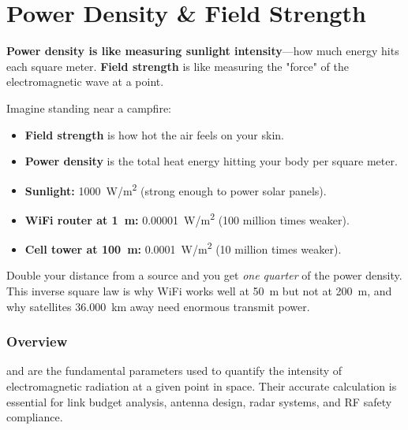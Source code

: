 
\chapter{Power Density \& Field Strength}
\label{ch:power-density}

\begin{nontechnical}
    \textbf{Power density is like measuring sunlight intensity}---how much energy hits each square meter. \textbf{Field strength} is like measuring the "force" of the electromagnetic wave at a point.

     Imagine standing near a campfire:
    \begin{itemize}
        \item \textbf{Field strength} is how hot the air feels on your skin.
        \item \textbf{Power density} is the total heat energy hitting your body per square meter.
    \end{itemize}

    \begin{itemize}
        \item \textbf{Sunlight:} \qty{1000}{W/m^2} (strong enough to power solar panels).
        \item \textbf{WiFi router at \qty{1}{m}:} \qty{0.00001}{W/m^2} (100 million times weaker).
        \item \textbf{Cell tower at \qty{100}{m}:} \qty{0.0001}{W/m^2} (10 million times weaker).
    \end{itemize}

     Double your distance from a source and you get \emph{one quarter} of the power density. This inverse square law is why WiFi works well at \qty{50}{m} but not at \qty{200}{m}, and why satellites \qty{36,000}{km} away need enormous transmit power.
\end{nontechnical}

\subsection{Overview}

 and  are the fundamental parameters used to quantify the intensity of electromagnetic radiation at a given point in space. Their accurate calculation is essential for link budget analysis, antenna design, radar systems, and RF safety compliance.

